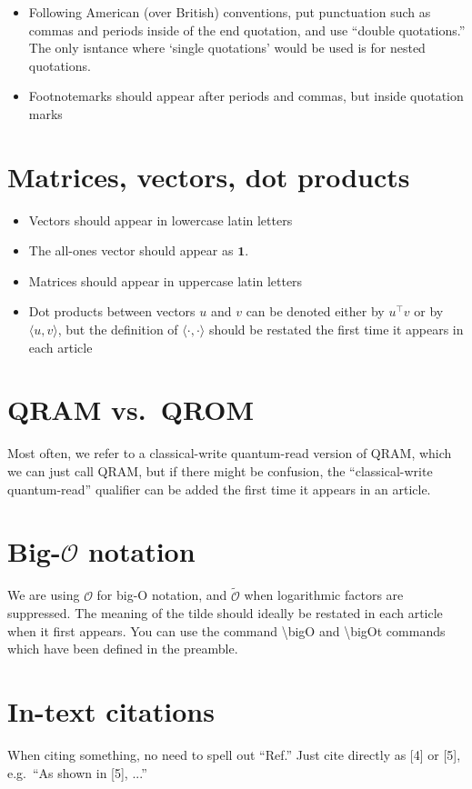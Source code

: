 \begin{itemize}
    \item Following American (over British) conventions, put punctuation such as commas and periods inside of the end quotation, and use ``double quotations.'' The only isntance where `single quotations' would be used is for nested quotations. 
    \item Footnotemarks should appear after periods and commas, but inside quotation marks
\end{itemize}

\section{Matrices, vectors, dot products}
\begin{itemize}
    \item Vectors should appear in lowercase latin letters
    \item The all-ones vector should appear as $\mathbf{1}$.
    \item Matrices should appear in uppercase latin letters
    \item Dot products between vectors $u$ and $v$ can be denoted either by $u^\intercal v$ or by $\langle u, v \rangle$, but the definition of $\langle \cdot, \cdot \rangle$ should be restated the first time it appears in each article
\end{itemize}

\section{QRAM vs.~QROM}
Most often, we refer to a classical-write quantum-read version of QRAM, which we can just call QRAM, but if there might be confusion, the ``classical-write quantum-read'' qualifier can be added the first time it appears in an article. 


\section{Big-$\mathcal{O}$ notation}\label{app:bigO}
We are using $\mathcal{O}$ for big-O notation, and $\tilde{\mathcal{O}}$ when logarithmic factors are suppressed. The meaning of the tilde should ideally be restated in each article when it first appears. You can use the command \textbackslash{bigO} and \textbackslash{bigOt} commands which have been defined in the preamble. 

\section{In-text citations}

When citing something, no need to spell out ``Ref.'' Just cite directly as [4] or [5], e.g.~``As shown in [5], ...''
